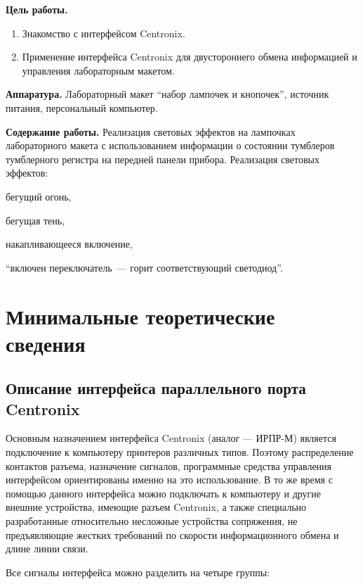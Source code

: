 \def \eng #1{\foreignlanguage{english}{#1}}
\def \engtt #1{\eng{\texttt{\justify #1}}}

\textbf{Цель работы.}
%
\begin{enumerate}
	\item Знакомство с интерфейсом \eng{Centronix}.
    \item Применение интерфейса \eng{Centronix} для двустороннего обмена информацией и управления лабораторным макетом.
\end{enumerate}

\textbf{Аппаратура.} Лабораторный макет \enquote{набор лампочек и кнопочек}, источник питания, персональный компьютер.

\textbf{Содержание работы.} Реализация световых эффектов на лампочках лабораторного макета с использованием информации о состоянии тумблеров тумблерного регистра на передней панели прибора. Реализация световых эффектов: \begin{enumerate*}[label=(\asbuk*)]
    \item бегущий огонь,
    \item бегущая тень,
    \item накапливающееся включение,
    \item \enquote{включен переключатель~--- горит соответствующий светодиод}.
\end{enumerate*}

\section{Минимальные теоретические сведения}

\subsection{Описание интерфейса параллельного порта \eng{Centronix}}

Основным назначением интерфейса \eng{Centronix} (аналог — ИРПР-М) является подключение к компьютеру принтеров различных типов. Поэтому распределение контактов разъема, назначение сигналов, программные средства управления интерфейсом ориентированы именно на это использование. В то же время с помощью данного интерфейса можно подключать к компьютеру и другие внешние устройства, имеющие разъем \eng{Centronix}, а также специально разработанные относительно несложные устройства сопряжения, не предъявляющие жестких требований по скорости информационного обмена и длине линии связи.

Все сигналы интерфейса можно разделить на четыре группы:

